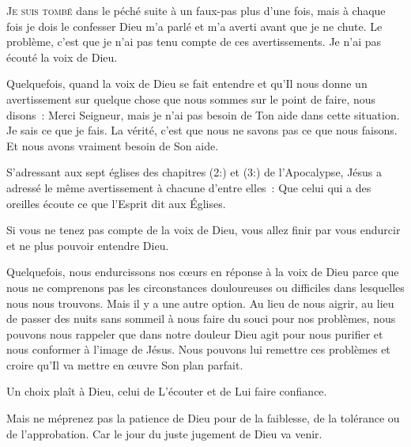 

\lettrine{J}{e suis tombé} dans le péché suite à un faux-pas
 plus d'une fois, mais à chaque fois \ocadr je dois le confesser \fcadr{}
 Dieu m'a parlé et m'a averti avant que je ne chute.
 Le problème, c'est que je n'ai pas tenu compte de ces avertissements.
 Je n'ai pas écouté la voix de Dieu. 

Quelquefois, quand la voix de Dieu se fait entendre et qu'Il nous donne
 un avertissement sur quelque chose que nous sommes sur le point de faire,
 nous disons~:
 \Og Merci Seigneur, mais je n'ai pas besoin de Ton aide dans cette situation.
 Je sais ce que je fais. \Fg{}
 La vérité, c'est que nous ne savons pas ce que nous faisons.
 Et nous avons vraiment besoin de Son aide. 

S'adressant aux sept églises des chapitres (2:)
 et (3:) de l'Apocalypse,
 Jésus a adressé le même avertissement à chacune d'entre elles~:
 \Og Que celui qui a des oreilles écoute
 ce que l'Esprit dit aux Églises. \Fg{}


Si vous ne tenez pas compte de la voix de Dieu,
 vous allez finir par vous endurcir et ne plus pouvoir entendre Dieu.

Quelquefois, nous endurcissons nos c\oe{}urs en réponse à la voix de Dieu
 parce que nous ne comprenons pas les circonstances douloureuses ou difficiles
 dans lesquelles nous nous trouvons.
 Mais il y a une autre option. Au lieu de nous aigrir,
 au lieu de passer des nuits sans sommeil à nous faire du souci
 pour nos problèmes, nous pouvons nous rappeler que dans notre douleur Dieu
 agit pour nous purifier et nous conformer à l'image de Jésus.
 Nous pouvons lui remettre ces problèmes et croire qu'Il va mettre
 en \oe{}uvre Son plan parfait. 

Un choix plaît à Dieu, celui de L'écouter et de Lui faire confiance. 

Mais ne méprenez pas la patience de Dieu pour de la faiblesse,
 de la tolérance ou de l'approbation.
 Car le jour du juste jugement de Dieu va venir.

\dvrule



